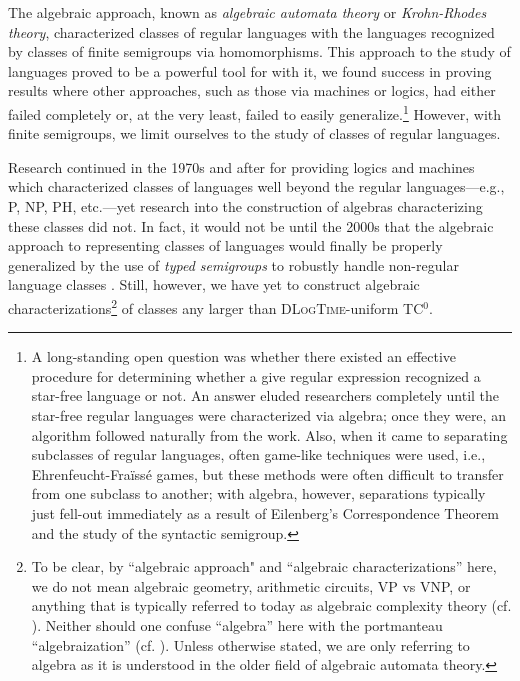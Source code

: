 \documentclass[a4paper,UKenglish,cleveref, autoref, thm-restate, anonymous]{lipics-v2021}
\begin{document}
The algebraic approach, known as \emph{algebraic automata theory} or \emph{Krohn-Rhodes theory}, characterized classes of regular languages with the languages recognized by classes of finite semigroups via homomorphisms. This approach to the study of languages proved to be a powerful tool for with it, we found success in proving results where other approaches, such as those via machines or logics, had either failed completely or, at the very least, failed to easily generalize.\footnote{A long-standing open question was whether there existed an effective procedure for determining whether a give regular expression recognized a star-free language or not. An answer eluded researchers completely until the star-free regular languages were characterized via algebra; once they were, an algorithm followed naturally from the work. Also, when it came to separating subclasses of regular languages, often game-like techniques were used, i.e., Ehrenfeucht-Fra{\"i}ss{\'e} games, but these methods were often difficult to transfer from one subclass to another; with algebra, however, separations typically just fell-out immediately as a result of Eilenberg's Correspondence Theorem \cite{eilenberg1976automata} and the study of the syntactic semigroup.} However, with finite semigroups, we limit ourselves to the study of classes of regular languages.

Research continued in the 1970s and after for providing logics and machines which characterized classes of languages well beyond the regular languages---e.g., P, NP, PH, etc.---yet research into the construction of algebras characterizing these classes did not. In fact, it would not be until the 2000s that the algebraic approach to representing classes of languages would finally be properly generalized by the use of \emph{typed semigroups} to robustly handle non-regular language classes \cite{behle2007linear,behle2011typed,krebs2007characterizing,krebs2008typed,cano2021positive}. Still, however, we have yet to construct algebraic characterizations\footnote{To be clear, by ``algebraic approach" and ``algebraic characterizations'' here, we do not mean algebraic geometry, arithmetic circuits, VP vs VNP, or anything that is typically referred to today as algebraic complexity theory (cf. \cite[Ch. 12]{wigderson2019mathematics}). Neither should one confuse ``algebra'' here with the portmanteau ``algebraization'' (cf. \cite{aaronson2009algebrization}). Unless otherwise stated, we are only referring to algebra as it is understood in the older field of algebraic automata theory.} of classes any larger than \textsc{DLogTime}-uniform TC${}^0$.
\end{document}
